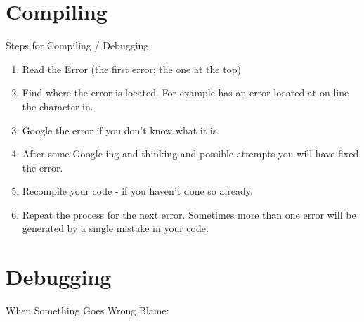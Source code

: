 \documentclass[main.tex]{subfiles}
\begin{document}
\section{Compiling} 
\label{sec:compiling}

\begin{frame}{Steps for Compiling / Debugging}
	\begin{enumerate}
		\item Read the Error (the first error; the one at the top)
		\item Find where the error is located. For example  has
			an error located at  on line  the  character
			in.
		\item Google the error if you don't know what it is.
		\item After some Google-ing and thinking and possible attempts you will have
			fixed the error.
		\item Recompile your code - if you haven't done so already.
		\item Repeat the process for the next error. Sometimes more than one error
			will be generated by a single mistake in your code.
	\end{enumerate}
\end{frame}


\section{Debugging} 
\label{sec:debugging}

\begin{frame}{When Something Goes Wrong Blame:}

	\begin{itemize}
	\end{itemize}

\end{frame}
\end{document}
